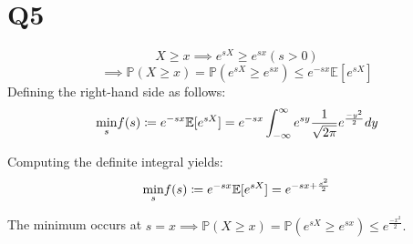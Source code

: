 \section{Q5}
\label{s:Q5}
$$X \geq x \implies e^{sX} \geq e^{sx} (s >0)$$
$$\implies \mathbb{P}(X \geq x) = \mathbb{P}(e^{sX} \geq e^{sx}) \leq e^{-sx}\mathbb{E}[e^{sX}]$$
Defining the right-hand side as follows:
$$\underset{s}{\text{min}} f(s) \coloneqq e^{-sx}\mathbb{E}[e^{sX}] = e^{-sx}\int_{-\infty}^{\infty}e^{sy}\frac{1}{\sqrt{2\pi}}e^{\frac{-y^2}{2}}dy$$

Computing the definite integral yields:
$$\underset{s}{\text{min}} f(s) \coloneqq e^{-sx}\mathbb{E}[e^{sX}] = e^{-sx + \frac{s^2}{2}}$$

The minimum occurs at $s=x \implies \mathbb{P}(X \geq x) = \mathbb{P}(e^{sX} \geq e^{sx}) \leq e^{\frac{-x^2}{2}}.$

